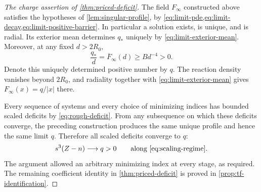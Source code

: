 \begin{proof}[The charge assertion of \cref{thm:priced-deficit}]
The field $F_\infty$ constructed above satisfies the hypotheses of
\cref{lem:singular-profile}, by
\cref{eq:limit-pde,eq:limit-decay,eq:limit-positive-barrier}.
In particular a solution exists, is unique, and is radial.
Its exterior mean determines $q_*$ uniquely by
\cref{eq:limit-exterior-mean}.  Moreover, at any fixed $d>2R_0$,
\[
 \frac{q_*}{d}=\overline F_\infty(d)\ge Bd^{-4}>0.
\]
Denote this uniquely determined positive number by $q$.
The reaction density vanishes beyond $2R_0$, and radiality together
with \cref{eq:limit-exterior-mean} gives $F_\infty(x)=q/|x|$ there.

Every sequence of systems and every choice of minimizing indices
has bounded scaled deficits by \cref{eq:rough-deficit}.  From any
subsequence on which these deficits converge, the preceding
construction produces the same unique profile and hence the same
limit $q$.  Therefore all scaled deficits converge to $q$:
\[
 s^3(Z-n)\longrightarrow q>0
 \qquad\text{along }\cref{eq:scaling-regime}.
\]
The argument allowed an arbitrary minimizing index at every stage,
as required.  The remaining coefficient identity in
\cref{thm:priced-deficit} is proved in \cref{prop:tf-identification}.
\end{proof}

